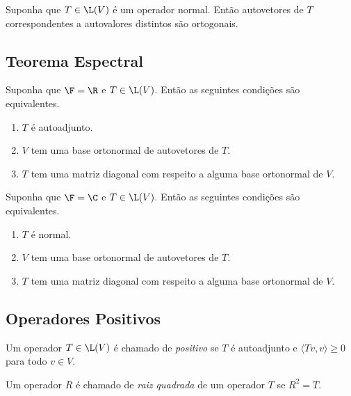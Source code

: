 \documentclass{article}
\begin{document}
\begin{prop}
    Suponha que \(T \in \L(V)\) é um operador normal. Então autovetores de \(T\) correspondentes a autovalores distintos são ortogonais.
\end{prop}

\subsection{Teorema Espectral}

\begin{thm} 
    Suponha que \(\F = \R\) e \(T \in \L(V)\). Então as seguintes condições são equivalentes.
    \begin{enumerate}
        \item[(a)] \(T\) é autoadjunto.
        \item[(b)] \(V\) tem uma base ortonormal de autovetores de \(T\).
        \item[(c)] \(T\) tem uma matriz diagonal com respeito a alguma base ortonormal de \(V\).
    \end{enumerate}
\end{thm}

\begin{thm} 
    Suponha que \(\F = \C\) e \(T \in \L(V)\). Então as seguintes condições são equivalentes.
    \begin{enumerate}
        \item[(a)] \(T\) é normal.
        \item[(b)] \(V\) tem uma base ortonormal de autovetores de \(T\).
        \item[(c)] \(T\) tem uma matriz diagonal com respeito a alguma base ortonormal de \(V\).
    \end{enumerate}
\end{thm}

\subsection{Operadores Positivos}

\begin{defn}
    Um operador \(T \in \L(V)\) é chamado de \emph{positivo} se \(T\) é autoadjunto e \(\langle Tv, v \rangle \geq 0\) para todo \(v \in V\).
\end{defn}

\begin{defn}
    Um operador \(R\) é chamado de \emph{raiz quadrada} de um operador \(T\) se \(R^2 = T\).
\end{defn}
\end{document}
